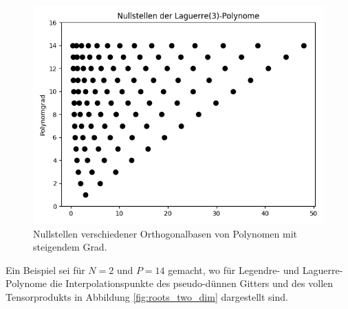 \begin{figure}[!htb]
  \includegraphics[width=\linewidth]{Figures/roots_laguerre.png}  
\endminipage
\caption{Nullstellen verschiedener Orthogonalbasen von Polynomen mit steigendem Grad.}
\label{fig:poly_roots}
\end{figure}
Ein Beispiel sei für $N=2$ und $P=14$ gemacht, wo für Legendre- und Laguerre-Polynome die Interpolationspunkte des pseudo-dünnen Gitters und des vollen Tensorprodukts in Abbildung \ref{fig:roots_two_dim} dargestellt sind.\\
